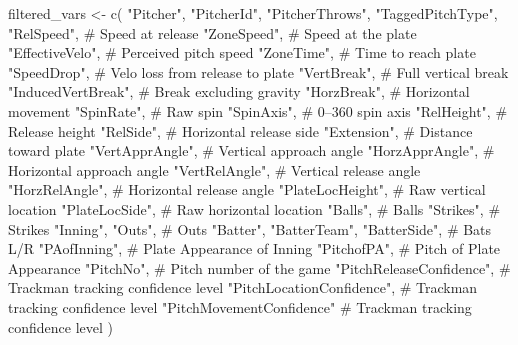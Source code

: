 \documentclass[
  letterpaper,
  DIV=11,
  numbers=noendperiod]{scrartcl}
\newenvironment{Shaded}{\begin{snugshade}}{\end{snugshade}}
\newcommand{\CommentTok}[1]{\textcolor[rgb]{0.37,0.37,0.37}{#1}}
\newcommand{\FunctionTok}[1]{\textcolor[rgb]{0.28,0.35,0.67}{#1}}
\newcommand{\NormalTok}[1]{\textcolor[rgb]{0.00,0.23,0.31}{#1}}
\newcommand{\OtherTok}[1]{\textcolor[rgb]{0.00,0.23,0.31}{#1}}
\newcommand{\StringTok}[1]{\textcolor[rgb]{0.13,0.47,0.30}{#1}}
\begin{document}
\begin{Shaded}
\begin{Highlighting}[]
\NormalTok{filtered\_vars }\OtherTok{\textless{}{-}} \FunctionTok{c}\NormalTok{(}
  \StringTok{"Pitcher"}\NormalTok{,}
  \StringTok{"PitcherId"}\NormalTok{,}
  \StringTok{"PitcherThrows"}\NormalTok{,}
  \StringTok{"TaggedPitchType"}\NormalTok{,}
  \StringTok{"RelSpeed"}\NormalTok{,           }\CommentTok{\# Speed at release}
  \StringTok{"ZoneSpeed"}\NormalTok{,          }\CommentTok{\# Speed at the plate}
  \StringTok{"EffectiveVelo"}\NormalTok{,      }\CommentTok{\# Perceived pitch speed}
  \StringTok{"ZoneTime"}\NormalTok{,           }\CommentTok{\# Time to reach plate}
  \StringTok{"SpeedDrop"}\NormalTok{,          }\CommentTok{\# Velo loss from release to plate}
  \StringTok{"VertBreak"}\NormalTok{,          }\CommentTok{\# Full vertical break}
  \StringTok{"InducedVertBreak"}\NormalTok{,   }\CommentTok{\# Break excluding gravity}
  \StringTok{"HorzBreak"}\NormalTok{,          }\CommentTok{\# Horizontal movement}
  \StringTok{"SpinRate"}\NormalTok{,           }\CommentTok{\# Raw spin}
  \StringTok{"SpinAxis"}\NormalTok{,           }\CommentTok{\# 0–360 spin axis}
  \StringTok{"RelHeight"}\NormalTok{,          }\CommentTok{\# Release height}
  \StringTok{"RelSide"}\NormalTok{,            }\CommentTok{\# Horizontal release side}
  \StringTok{"Extension"}\NormalTok{,          }\CommentTok{\# Distance toward plate}
  \StringTok{"VertApprAngle"}\NormalTok{,      }\CommentTok{\# Vertical approach angle}
  \StringTok{"HorzApprAngle"}\NormalTok{,      }\CommentTok{\# Horizontal approach angle}
  \StringTok{"VertRelAngle"}\NormalTok{,       }\CommentTok{\# Vertical release angle}
  \StringTok{"HorzRelAngle"}\NormalTok{,       }\CommentTok{\# Horizontal release angle}
  \StringTok{"PlateLocHeight"}\NormalTok{,     }\CommentTok{\# Raw vertical location}
  \StringTok{"PlateLocSide"}\NormalTok{,       }\CommentTok{\# Raw horizontal location}
  \StringTok{"Balls"}\NormalTok{,              }\CommentTok{\# Balls}
  \StringTok{"Strikes"}\NormalTok{,            }\CommentTok{\# Strikes}
  \StringTok{"Inning"}\NormalTok{,}
  \StringTok{"Outs"}\NormalTok{,               }\CommentTok{\# Outs}
  \StringTok{"Batter"}\NormalTok{,}
  \StringTok{"BatterTeam"}\NormalTok{,}
  \StringTok{"BatterSide"}\NormalTok{,         }\CommentTok{\# Bats L/R}
  \StringTok{"PAofInning"}\NormalTok{,         }\CommentTok{\# Plate Appearance of Inning}
  \StringTok{"PitchofPA"}\NormalTok{,          }\CommentTok{\# Pitch of Plate Appearance}
  \StringTok{"PitchNo"}\NormalTok{,            }\CommentTok{\# Pitch number of the game}
  \StringTok{"PitchReleaseConfidence"}\NormalTok{, }\CommentTok{\# Trackman tracking confidence level}
  \StringTok{"PitchLocationConfidence"}\NormalTok{, }\CommentTok{\# Trackman tracking confidence level}
  \StringTok{"PitchMovementConfidence"} \CommentTok{\# Trackman tracking confidence level}
\NormalTok{)}


\end{Highlighting}
\end{Shaded}
\end{document}
